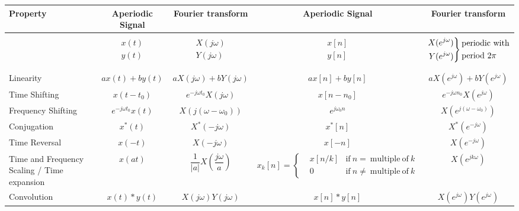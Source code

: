 \documentclass[landscape,a4paper]{article}
\begin{document}
\begin{table}[htbp]
\centering
\begin{tabular}{p{12em}<{\centering}cccc}
\hline
Property & Aperiodic Signal & Fourier transform & Aperiodic Signal & Fourier transform \\
\hline
& \\
& $\begin{aligned}x(t)\\y(t)\end{aligned}$ 
& $\begin{aligned}X(j\omega)\\Y(j\omega)\end{aligned}$ 
& $\begin{aligned}x[n]\\y[n]\end{aligned}$ 
& $\left.\begin{aligned}X(e^{j\omega})\\Y(e^{j\omega})\end{aligned}\right\}\begin{aligned}&{\rm periodic\ with}\\&{\rm period}\ 2\pi\end{aligned}$ \\
& \\
\hdashline
& \\
Linearity & $ax(t)+by(t)$ & $aX(j\omega)+bY(j\omega)$
& $ax[n]+by[n]$ & $aX(e^{j\omega})+bY(e^{j\omega})$ \\
Time Shifting & $x(t-t_0)$ & $e^{-j\omega t_0}X(j\omega)$
& $x[n-n_0]$ & $e^{-j\omega n_0}X(e^{j\omega})$ \\
Frequency Shifting & $e^{-j\omega t_0}x(t)$ & $X(j(\omega-\omega_0))$ 
& $e^{j\omega_0n}$ & $X(e^{j(\omega-\omega_0)})$ \\
Conjugation & $x^*(t)$ & $X^*(-j\omega)$ 
& $x^*[n]$ & $X^*(e^{-j\omega})$ \\
Time Reversal & $x(-t)$ & $X(-j\omega)$ 
& $x[-n]$ & $X(e^{-j\omega})$ \\
Time and Frequency Scaling / Time expansion & $x(at)$ & $\dfrac{1}{|a|}X(\dfrac{j\omega}{a})$ 
& $x_k[n]=\left\{\begin{aligned}
& x[n/k] & \mathrm{if}\ n=\ \mathrm{multiple\ of}\ k\\
& 0 & \mathrm{if}\ n\neq\ \mathrm{multiple\ of}\ k
\end{aligned}\right.$ & $X(e^{jk\omega})$\\
Convolution & $x(t)*y(t)$ & $X(j\omega)Y(j\omega)$
& $x[n]*y[n]$ & $X(e^{j\omega})Y(e^{j\omega})$ \\

\end{tabular}
\end{table}
\end{document}

